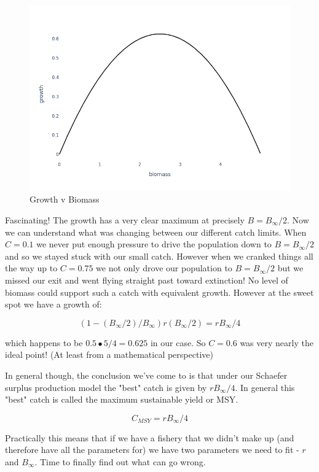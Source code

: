 \documentclass[11pt,a5paper]{book}
\begin{document}
\begin{figure}[h!] 
  \includegraphics[width=\linewidth]{notebooks/SurplusModels/surplus_yield.png}
  \caption{Growth v Biomass}
  \label{fig:growth_v_biomass}
\end{figure}

Fascinating! The growth has a very clear maximum at precisely $B=B_\infty / 2$. Now we can understand what was changing between our different catch limits. When $C=0.1$ we never put enough pressure to drive the population down to $B=B_\infty / 2$ and so we stayed stuck with our small catch. However when we cranked things all the way up to $C=0.75$ we not only drove our population to $B=B_\infty / 2$ but we missed our exit and went flying straight past toward extinction! No level of biomass could support such a catch with equivalent growth. However at the sweet spot we have a growth of:

$$(1-(B_\infty/2) / B_\infty)r(B_\infty /2) = rB_\infty / 4$$

which happens to be $0.5 \bullet 5 / 4 = 0.625$ in our case. So $C=0.6$ was very nearly the ideal point! (At least from a mathematical perspective)
\newline

In general though, the conclusion we've come to is that under our Schaefer surplus production model the "best" catch is given by $rB_\infty / 4$. In general this "best" catch is called the maximum sustainable yield or MSY. 

$$C_{MSY} = rB_\infty /4$$

Practically this means that if we have a fishery that we didn't make up (and therefore have all the parameters for) we have two parameters we need to fit - $r$ and $B_\infty$. Time to finally find out what can go wrong.
\end{document}
